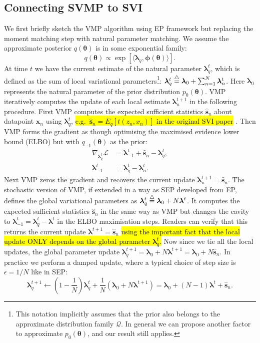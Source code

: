 \documentclass{article} %
\begin{document}
\subsection{Connecting SVMP to SVI}
We first briefly sketch the VMP algorithm using EP framework but replacing the moment matching step with natural parameter matching. We assume the approximate posterior $q(\bm{\theta})$ is in some exponential family: 
\begin{equation}
q(\bm{\theta}) \propto \exp \left[ \langle \bm{\lambda}_q, \bm{\phi}(\bm{\theta}) \rangle \right].
\end{equation}
At time $t$ we have the current estimate of the natural parameter $\bm{\lambda}_q^t$, which is defined as the sum of local variational parameters\footnote{This notation implicitly assumes that the prior also belongs to the approximate distribution family $\mathcal{Q}$. In general we can propose another factor to approximate $p_0(\bm{\theta})$, and our result still applies.}:
%
$\bm{\lambda}_q^t \buildrel\triangle\over = \bm{\lambda}_0 + \sum_{n=1}^N \bm{\lambda}_n^t$.
%
Here $\bm{\lambda}_0$ represents the natural parameter of the prior distribution $p_0(\bm{\theta})$. VMP iteratively computes the update of each local estimate $\bm{\lambda}_n^{t+1}$ in the following procedure. First VMP computes the expected sufficient statistics $\hat{\bm{s}}_n$ about datapoint $\bm{x}_n$ using $\bm{\lambda}_q^t$, \hl{e.g.~$\hat{\bm{s}}_n = E_{q}[t(z_n, x_n)]$ in the original SVI paper} \cite{hoffman:svi}. Then VMP forms the gradient as though optimising the maximised evidence lower bound (ELBO) but with $q_{-1}(\bm{\theta})$ as the prior:
\begin{align}
\nabla_{\bm{\lambda}_q^t} \mathcal{L} &= \bm{\lambda}_{-1}^t + \hat{\bm{s}}_n - \bm{\lambda}_q^t, \\
\bm{\lambda}_{-1}^t &= \bm{\lambda}_q^t - \bm{\lambda}_{n}^t.
\end{align}
Next VMP zeros the gradient and recovers the current update $\bm{\lambda}_n^{t+1} = \hat{\bm{s}}_n$. The stochastic version of VMP, if extended in a way as SEP developed from EP, defines the global variational parameters as $\bm{\lambda}_q^t \buildrel\triangle\over = \bm{\lambda}_0 + N \bm{\lambda}^t$. It computes the expected sufficient statistics $\hat{\bm{s}}_n$ in the same way as VMP but changes the cavity to $\bm{\lambda}_{-1}^t = \bm{\lambda}_q^t - \bm{\lambda}^t$ in the ELBO maximisation steps. Readers can verify that this returns the current update $\bm{\lambda}^{t+1} = \hat{\bm{s}}_n$ \hl{using the important fact that the local update ONLY depends on the global parameter $\bm{\lambda}_q^t$.} Now since we tie all the local updates, the global parameter update $\bm{\lambda}_q^{t+1} = \bm{\lambda}_0 + N \bm{\lambda}^{t+1} = \bm{\lambda}_0 + N \hat{\bm{s}}_n$. In practice we perform a damped update, where a typical choice of step size is $\epsilon = 1/N$ like in SEP:
\begin{equation}
\bm{\lambda}_q^{t+1} \leftarrow (1 - \frac{1}{N}) \bm{\lambda}_q^t + \frac{1}{N}(\bm{\lambda}_0 + N \bm{\lambda}^{t+1}) = \bm{\lambda}_0 + (N-1) \bm{\lambda}^t + \hat{\bm{s}}_n.
\end{equation} 
\end{document}
